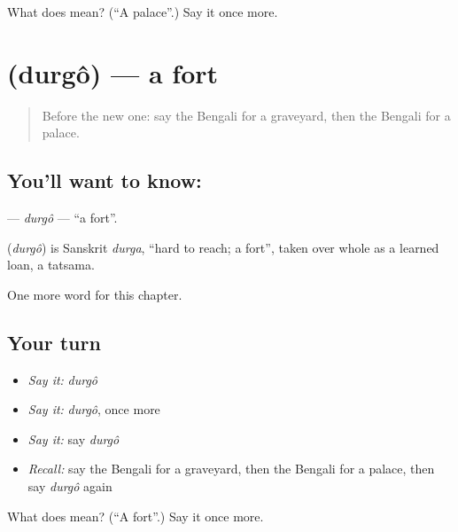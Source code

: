 \begin{tcolorbox}[breakable,colback=teal!4,colframe=teal!35!black,title={Before you move on}]
What does  mean? (\textquotedblleft{}A palace\textquotedblright{}.) Say it once more.
\end{tcolorbox}
\section[\texorpdfstring{\bn{দুর্গ} (durgô)}{দুর্গ (durgô)}]{ (durgô) — a fort}

\label{lesson:BN-C158-durgo}



\begin{quote}
Before the new one: say the Bengali for a graveyard, then the Bengali for a palace.
\end{quote}

\subsection*{You'll want to know: }
\textbf{} — \emph{durgô} — \textquotedblleft{}a fort\textquotedblright{}.

\begin{cousinweb}
\textbf{} (\emph{durgô}) is Sanskrit \emph{durga}, \textquotedblleft{}hard to reach; a fort\textquotedblright{}, taken over whole as a learned loan, a tatsama.
\end{cousinweb}

\begin{grammarlens}[title={What you've built}]
One more word for this chapter.
\end{grammarlens}

\subsection*{Your turn}
\begin{itemize}
\raggedright
  \item \emph{Say it:} \emph{durgô}
  \item \emph{Say it:} \emph{durgô}, once more
  \item \emph{Say it:} say \emph{durgô}
  \item \emph{Recall:} say the Bengali for a graveyard, then the Bengali for a palace, then say \emph{durgô} again
\end{itemize}

\begin{tcolorbox}[breakable,colback=teal!4,colframe=teal!35!black,title={Before you move on}]
What does  mean? (\textquotedblleft{}A fort\textquotedblright{}.) Say it once more.
\end{tcolorbox}

